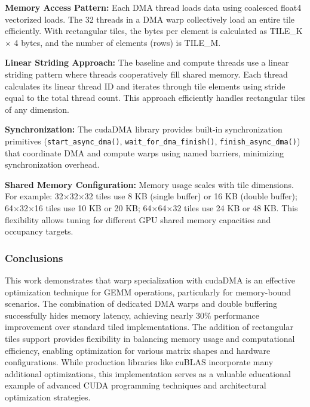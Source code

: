 \textbf{Memory Access Pattern:} Each DMA thread loads data using coalesced float4 vectorized loads. The 32 threads in a DMA warp collectively load an entire tile efficiently. With rectangular tiles, the bytes per element is calculated as TILE\_K $\times$ 4 bytes, and the number of elements (rows) is TILE\_M.

\textbf{Linear Striding Approach:} The baseline and compute threads use a linear striding pattern where threads cooperatively fill shared memory. Each thread calculates its linear thread ID and iterates through tile elements using stride equal to the total thread count. This approach efficiently handles rectangular tiles of any dimension.

\textbf{Synchronization:} The cudaDMA library provides built-in synchronization primitives (\texttt{start\_async\_dma()}, \texttt{wait\_for\_dma\_finish()}, \texttt{finish\_async\_dma()}) that coordinate DMA and compute warps using named barriers, minimizing synchronization overhead.

\textbf{Shared Memory Configuration:} Memory usage scales with tile dimensions. For example: 32$\times$32$\times$32 tiles use 8 KB (single buffer) or 16 KB (double buffer); 64$\times$32$\times$16 tiles use 10 KB or 20 KB; 64$\times$64$\times$32 tiles use 24 KB or 48 KB. This flexibility allows tuning for different GPU shared memory capacities and occupancy targets.

\subsubsection{Conclusions}

This work demonstrates that warp specialization with cudaDMA is an effective optimization technique for GEMM operations, particularly for memory-bound scenarios. The combination of dedicated DMA warps and double buffering successfully hides memory latency, achieving nearly 30\% performance improvement over standard tiled implementations. The addition of rectangular tiles support provides flexibility in balancing memory usage and computational efficiency, enabling optimization for various matrix shapes and hardware configurations. While production libraries like cuBLAS incorporate many additional optimizations, this implementation serves as a valuable educational example of advanced CUDA programming techniques and architectural optimization strategies.

